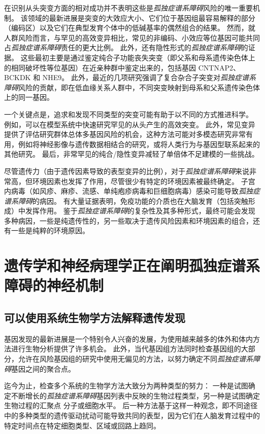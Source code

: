 在识别从头突变方面的相对成功并不表明这些是\textit{孤独症谱系障碍}风险的唯一重要机制。
该领域的最新进展是突变的大效应大小、它们位于基因组最容易解释的部分（编码区）以及它们在典型发育个体中的低碱基率的偶然组合的结果。
然而，就人群风险而言，与罕见的高效变异相比，常见的非编码、小效应等位基因可能共同占\textit{孤独症谱系障碍}责任的更大比例。
此外，还有隐性形式的\textit{孤独症谱系障碍}的证据。
这些最初主要是通过鉴定纯合子功能丧失突变（即父系和母系遗传染色体上的相同破坏性等位基因）在近亲种群中鉴定出来的，包括基因 CNTNAP2、BCKDK 和 NHE9。
此外，最近的几项研究强调了复合杂合子突变对\textit{孤独症谱系障碍}风险的贡献，即在低血缘关系人群中，不同突变映射到母系和父系遗传染色体上的同一基因。


一个关键点是，追求和发现不同类型的突变可能有助于以不同的方式推进科学。
例如，可以在模型系统中快速研究罕见的从头产生的高效突变。
此外，常见变异提供了评估研究群体总体多基因风险的机会，这种方法可能对多模态研究非常有用，例如将神经影像与遗传数据相结合的研究，或将人类行为与基因型联系起来的其他研究。
最后，非常罕见的纯合/隐性变异减轻了单倍体不足建模的一些挑战。


尽管遗传力（由于遗传因素导致的表型变异的比例），对于\textit{孤独症谱系障碍}来说非常高，但环境因素也发挥了作用，尽管很少有特定的环境因素被最终确定。
子宫内病毒（如风疹、麻疹、流感、单纯疱疹病毒和巨细胞病毒）感染可能导致\textit{孤独症谱系障碍}的病因。
有大量证据表明，免疫功能的介质也在大脑发育（包括突触形成）中发挥作用。
鉴于\textit{孤独症谱系障碍}的复杂性及其多种形式，最终可能会发现多种病因，一些是纯遗传性的，另一些取决于遗传风险因素和环境因素的组合，还有一些是纯粹的环境原因。



\section{遗传学和神经病理学正在阐明孤独症谱系障碍的神经机制}

\subsection{可以使用系统生物学方法解释遗传发现}

基因发现的最新进展是一个特别令人兴奋的发展，为使用越来越多的体外和体内方法进行生物分析提供了许多机会。
此外，当代基因组方法同时检查基因组的大部分，允许在风险基因组的研究中使用无偏见的方法，以努力确定不同\textit{孤独症谱系障碍}基因之间的聚合点。


迄今为止，检查多个系统的生物学方法大致分为两种类型的努力：
一种是试图确定不断增长的\textit{孤独症谱系障碍}基因列表中反映的生物过程类型，另一种是试图确定生物过程的汇聚点 分子或细胞水平。
后一种方法基于这样一种观念，即不同途径中的多种类型的遗传驱动扰动可能导致共同的表型，因为它们在人脑发育过程中的特定时间点在特定细胞类型、区域或回路上趋同。


